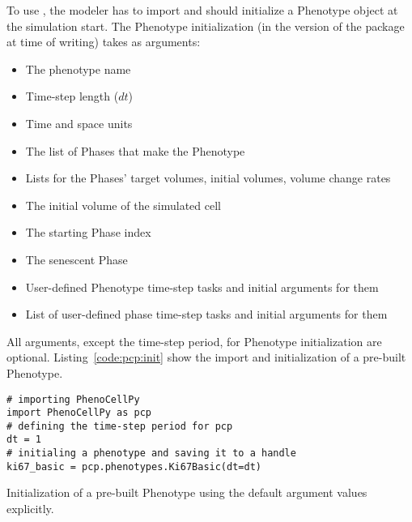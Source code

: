 To use \pcp, the modeler has to import \pcps and should initialize a Phenotype object at the simulation start. The Phenotype initialization (in the version of the package at time of writing) takes as arguments: 
\begin{itemize}\setlength\itemsep{.01em}
    \item The phenotype name
    \item Time-step length ($dt$)
    \item Time and space units
    \item The list of Phases that make the Phenotype
    \item Lists for the Phases' target volumes, initial volumes, volume change rates
    \item The initial volume of the simulated cell
    \item The starting Phase index
    \item The senescent Phase
    \item User-defined Phenotype time-step tasks and initial arguments for them
    \item List of user-defined phase time-step tasks and initial arguments for them
\end{itemize}
\noindent All arguments, except the time-step period, for Phenotype initialization are optional. Listing~\ref{code:pcp:init} show the import and initialization of a pre-built Phenotype.

\begin{listing}[!htb]
\begin{verbatim}
# importing PhenoCellPy
import PhenoCellPy as pcp
# defining the time-step period for pcp
dt = 1
# initialing a phenotype and saving it to a handle
ki67_basic = pcp.phenotypes.Ki67Basic(dt=dt)
\end{verbatim}
\caption{Initialization of a pre-built Phenotype using the default argument values explicitly.}\label{code:pcp:init}
\end{listing}



